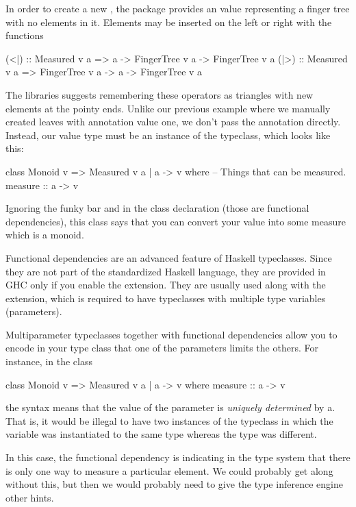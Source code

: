 In order to create a new , the package provides an  value
representing a finger tree with no elements in it. Elements may be inserted on the left or right with the functions
\begin{haskell}
(<|) :: Measured v a => a -> FingerTree v a -> FingerTree v a
(|>) :: Measured v a => FingerTree v a -> a -> FingerTree v a
\end{haskell}
The libraries suggests remembering these operators as triangles with new elements at the pointy
ends. Unlike our previous example where we manually created leaves with annotation value one, we
don't pass the annotation directly. Instead, our value type must be an instance of the
 typeclass, which looks like this:
\begin{haskell}
class Monoid v => Measured v a | a -> v where
    -- Things that can be measured.
    measure :: a -> v
\end{haskell}
Ignoring the funky bar and  in the class declaration (those are functional
dependencies), this class says that you can convert your value  into some measure
 which is a monoid.

\begin{tangent}[frametitle=Functional Dependencies]
Functional dependencies are an advanced feature of Haskell typeclasses. Since they are not part of
the standardized Haskell language, they are provided in GHC only if you enable the
 extension. They are usually used along with the
 extension, which is required to have typeclasses with multiple type
variables (parameters).

Multiparameter typeclasses together with functional dependencies allow you to encode in your type
class that one of the parameters limits the others. For instance, in the class
\begin{haskell}
class Monoid v => Measured v a | a -> v where
    measure :: a -> v
\end{haskell}
the syntax  means that the value of the  parameter is \emph{uniquely
determined} by a. That is, it would be illegal to have two instances of the 
typeclass in which the  variable was instantiated to the same type whereas the 
type was different.

In this case, the functional dependency is indicating in the type system that there is only one way
to measure a particular element. We could probably get along without this, but then we would
probably need to give the type inference engine other hints.
\end{tangent}

